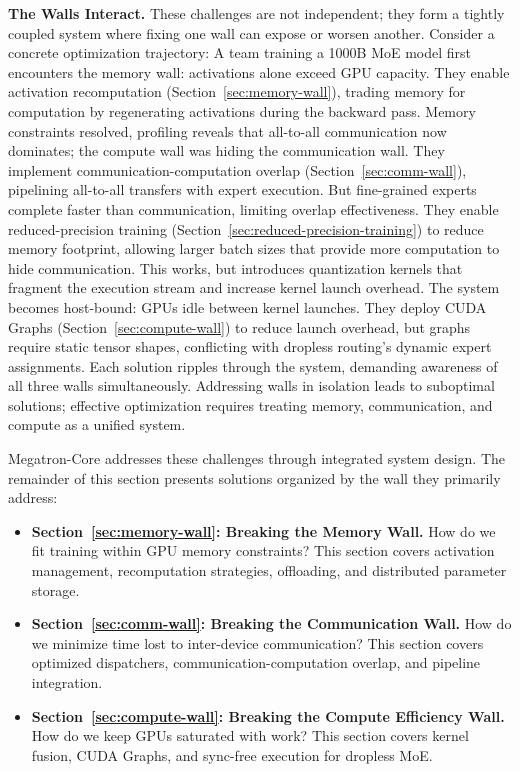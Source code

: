 \textbf{The Walls Interact.} These challenges are not independent; they form a tightly coupled system where fixing one wall can expose or worsen another. Consider a concrete optimization trajectory: A team training a 1000B MoE model first encounters the memory wall: activations alone exceed GPU capacity. They enable activation recomputation (Section~\ref{sec:memory-wall}), trading memory for computation by regenerating activations during the backward pass. Memory constraints resolved, profiling reveals that all-to-all communication now dominates; the compute wall was hiding the communication wall. They implement communication-computation overlap (Section~\ref{sec:comm-wall}), pipelining all-to-all transfers with expert execution. But fine-grained experts complete faster than communication, limiting overlap effectiveness. They enable reduced-precision training (Section~\ref{sec:reduced-precision-training}) to reduce memory footprint, allowing larger batch sizes that provide more computation to hide communication. This works, but introduces quantization kernels that fragment the execution stream and increase kernel launch overhead. The system becomes host-bound: GPUs idle between kernel launches. They deploy CUDA Graphs (Section~\ref{sec:compute-wall}) to reduce launch overhead, but graphs require static tensor shapes, conflicting with dropless routing's dynamic expert assignments. Each solution ripples through the system, demanding awareness of all three walls simultaneously. Addressing walls in isolation leads to suboptimal solutions; effective optimization requires treating memory, communication, and compute as a unified system.

Megatron-Core addresses these challenges through integrated system design. The remainder of this section presents solutions organized by the wall they primarily address:
\begin{itemize}
    \item \textbf{Section~\ref{sec:memory-wall}: Breaking the Memory Wall.} How do we fit training within GPU memory constraints? This section covers activation management, recomputation strategies, offloading, and distributed parameter storage.
    \item \textbf{Section~\ref{sec:comm-wall}: Breaking the Communication Wall.} How do we minimize time lost to inter-device communication? This section covers optimized dispatchers, communication-computation overlap, and pipeline integration.
    \item \textbf{Section~\ref{sec:compute-wall}: Breaking the Compute Efficiency Wall.} How do we keep GPUs saturated with work? This section covers kernel fusion, CUDA Graphs, and sync-free execution for dropless MoE.
\end{itemize}

